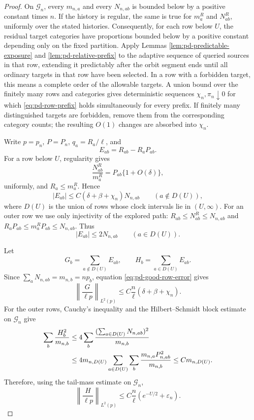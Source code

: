 \documentclass[11pt]{article}
\theoremstyle{remark}
\begin{document}
\begin{proof}
On $\mathcal G_n$, every $m_{n,a}$ and every $N_{n,ab}$ is bounded below by a
positive constant times $n$.  If the history is regular, the same is true for
$m_a^R$ and $N_{ab}^R$, uniformly over the stated histories.  Consequently,
for each row below $U$, the residual target categories have proportions bounded
below by a positive constant depending only on the fixed partition.  Apply
Lemmas \ref{lem:pd-predictable-exposure} and
\ref{lem:pd-relative-prefix} to the adaptive sequence of queried sources in
that row, extending it predictably after the orbit segment ends until all
ordinary targets in that row have been selected.  In a row with a forbidden
target, this means a complete order of the allowable targets.  A union bound over the finitely many rows and categories gives
deterministic sequences $\chi_n,\pi_n\downarrow0$ for which
\eqref{eq:pd-row-prefix} holds simultaneously for every prefix.  If finitely
many distinguished targets are forbidden, remove them from the corresponding
category counts; the resulting $O(1)$ changes are absorbed into $\chi_n$.

Write $p=p_n$, $P=P_n$, $q_a=R_a/\ell$, and
\[
        E_{ab}=R_{ab}-R_aP_{ab}.
\]
For a row below $U$, regularity gives
\[
 \frac{N_{ab}^R}{m_a^R}=P_{ab}\{1+O(\delta)\},
\]
uniformly, and $R_a\le m_a^R$.  Hence
\begin{equation}
        |E_{ab}|
        \le C(\delta+\beta+\chi_n)N_{n,ab}
        \qquad(a\notin D(U)),
 \label{eq:pd-good-row-error}
\end{equation}
where $D(U)$ is the union of rows whose clock intervals lie in $(U,\infty)$.
For an outer row we use only injectivity of the explored path:
$R_{ab}\le N_{ab}^R\le N_{n,ab}$ and
$R_aP_{ab}\le m_a^RP_{ab}\le N_{n,ab}$.  Thus
\begin{equation}
        |E_{ab}|\le2N_{n,ab}
        \qquad(a\in D(U)).
 \label{eq:pd-bad-row-error}
\end{equation}

Let
\[
        G_b=\sum_{a\notin D(U)}E_{ab},
        \qquad H_b=\sum_{a\in D(U)}E_{ab}.
\]
Since $\sum_aN_{n,ab}=m_{n,b}=np_b$, equation
\eqref{eq:pd-good-row-error} gives
\begin{equation}
 \left\|\frac{G}{\ell p}\right\|_{L^2(p)}
 \le C\frac n\ell(\delta+\beta+\chi_n).
 \label{eq:pd-good-L2}
\end{equation}
For the outer rows, Cauchy's inequality and the Hilbert--Schmidt block estimate
on $\mathcal G_n$ give
\begin{align}
 \sum_b\frac{H_b^2}{m_{n,b}}
 &\le4\sum_b\frac{(\sum_{a\in D(U)}N_{n,ab})^2}{m_{n,b}}\notag\\
 &\le4m_{n,D(U)}
 \sum_{a\in D(U)}\sum_b
 \frac{m_{n,a}P_{n,ab}^2}{m_{n,b}}
 \le C m_{n,D(U)}.
 \label{eq:pd-bad-L2-raw}
\end{align}
Therefore, using the tail-mass estimate on $\mathcal G_n$,
\begin{equation}
 \left\|\frac{H}{\ell p}\right\|_{L^2(p)}
 \le C\frac n\ell
       \left(e^{-U/2}+\varepsilon_n\right).
 \label{eq:pd-bad-L2}
\end{equation}


\end{proof}
\end{document}
